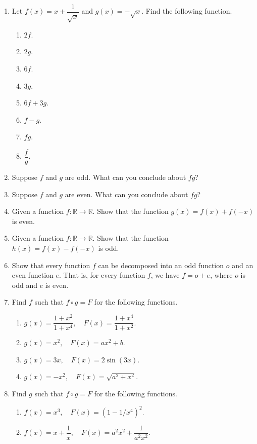 \documentclass[11pt]{book}
\theoremstyle{break}
\theoremstyle{no_label}
\newcommand{\bbR}{\mathbb{R}}
\numberwithin{equation}{section}
\begin{document}
\begin{enumerate}[label=\arabic*.]
    \item Let $f(x)=x+\dfrac{1}{\sqrt{x}}$ and $g(x)=-\sqrt{x}$. Find the following function.
    \begin{multicols}{4}
        \begin{enumerate}
            \item $2f$.
            \item $2g$.
            \item $6f$.
            \item $3g$.
            \item $6f+3g$.
            \item $f-g$.
            \item $fg$.
            \item $\dfrac{f}{g}$.
        \end{enumerate}
    \end{multicols}
    \item Suppose $f$ and $g$ are odd. What can you conclude about $fg$?
    \item Suppose $f$ and $g$ are even. What can you conclude about $fg$?
    \item Given a function $f:\bbR\to\bbR$. Show that the function $g(x)=f(x)+f(-x)$ is even.
    \item Given a function $f:\bbR\to\bbR$. Show that the function $h(x)=f(x)-f(-x)$ is odd.
    \item Show that every function $f$ can be decomposed into an odd function $o$ and an even function $e$. That is, for every function $f$, we have $f=o+e$, where $o$ is odd and $e$ is even.
    \item Find $f$ such that $f\circ g=F$ for the following functions.
    \begin{enumerate}
        \item $g(x)=\dfrac{1+x^2}{1+x^4}, \quad F(x)=\dfrac{1+x^4}{1+x^2}$.
        \item $g(x)=x^2, \quad F(x)=ax^2+b$.
        \item $g(x)=3x, \quad F(x)=2\sin(3x)$.
        \item $g(x)=-x^2, \quad F(x)=\sqrt{a^2+x^2}$.
    \end{enumerate}
    \item Find $g$ such that $f\circ g=F$ for the following functions.
    \begin{enumerate}
        \item $f(x)=x^3, \quad F(x)=(1-1/x^4)^2$.
        \item $f(x)=x+\dfrac{1}{x}, \quad F(x)=a^2x^2+\dfrac{1}{a^2x^2}$.

\end{enumerate}
\end{enumerate}
\end{document}
